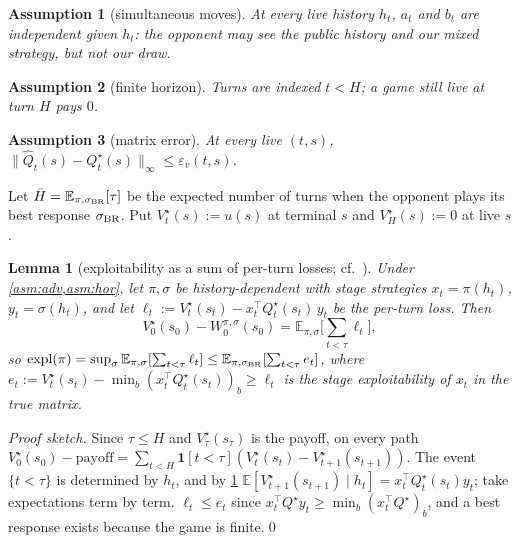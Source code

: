 \documentclass[10pt]{article}
\theoremstyle{tplain}
\newtheorem{lemma}[theorem]{Lemma}
\theoremstyle{tdef}
\newtheorem{assumption}{Assumption}
\theoremstyle{trem}
\newcommand{\E}{\mathbb{E}}
\newcommand{\Hbar}{\bar H}
\newcommand{\epsv}{\varepsilon_v}
\newcommand{\Qhat}{\hat Q}
\newcommand{\Qstar}{Q^\star}
\newcommand{\Vstar}{V^\star}
\DeclareMathOperator{\expl}{expl}
\begin{document}
\begin{assumption}[simultaneous moves]\label{asm:adv} At every live history $h_t$, $a_t$ and $b_t$ are independent given $h_t$: the opponent may see the public history and our mixed strategy, but not our draw.\end{assumption}
\begin{assumption}[finite horizon]\label{asm:hor} Turns are indexed $t<H$; a game still live at turn $H$ pays $0$.\end{assumption}
\begin{assumption}[matrix error]\label{asm:err} At every live $(t,s)$, $\lVert\Qhat_t(s)-\Qstar_t(s)\rVert_\infty\le\epsv(t,s)$.\end{assumption}

Let $\Hbar=\E_{\pi,\sigma_{\rm BR}}[\tau]$ be the expected number of turns when the opponent plays its best response $\sigma_{\rm BR}$. Put $\Vstar_t(s):=u(s)$ at terminal $s$ and $\Vstar_H(s):=0$ at live $s$.
\begin{lemma}[exploitability as a sum of per-turn losses; cf.\ {\cite[Lemma~6.1]{KL02}}]\label{lem:sum}
Under \cref{asm:adv,asm:hor}, let $\pi,\sigma$ be history-dependent with stage strategies $x_t=\pi(h_t)$, $y_t=\sigma(h_t)$, and let $\ell_t:=\Vstar_t(s_t)-x_t^\top\Qstar_t(s_t)\,y_t$ be the per-turn loss. Then
\[
\Vstar_0(s_0)-W^{\pi,\sigma}_0(s_0)=\E_{\pi,\sigma}\Big[\textstyle\sum_{t<\tau}\ell_t\Big],
\]
so $\expl(\pi)=\sup_\sigma\E_{\pi,\sigma}[\sum_{t<\tau}\ell_t]\le\E_{\pi,\sigma_{\rm BR}}[\sum_{t<\tau}e_t]$, where $e_t:=\Vstar_t(s_t)-\min_b(x_t^\top\Qstar_t(s_t))_b\ge\ell_t$ is the stage exploitability of $x_t$ in the true matrix.
\end{lemma}
\emph{Proof sketch.} Since $\tau\le H$ and $\Vstar_\tau(s_\tau)$ is the payoff, on every path $\Vstar_0(s_0)-\text{payoff}=\sum_{t<H}\mathbf 1[t<\tau](\Vstar_t(s_t)-\Vstar_{t+1}(s_{t+1}))$. The event $\{t<\tau\}$ is determined by $h_t$, and by \cref{asm:adv} $\E[\Vstar_{t+1}(s_{t+1})\mid h_t]=x_t^\top\Qstar_t(s_t)y_t$; take expectations term by term. $\ell_t\le e_t$ since $x_t^\top\Qstar y_t\ge\min_b(x_t^\top\Qstar)_b$, and a best response exists because the game is finite.\qed
\end{document}
